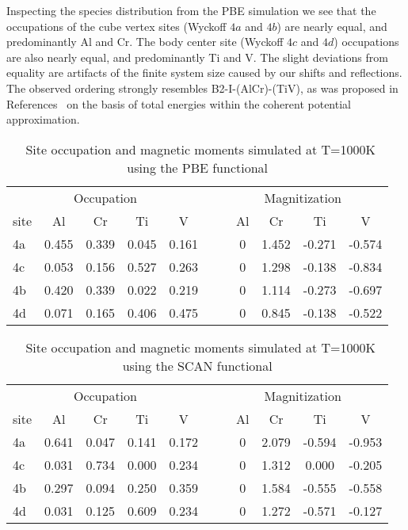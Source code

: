 \documentclass[twoside,12pt]{article}
\begin{document}
Inspecting the species distribution from the PBE simulation we see that the occupations of the cube vertex sites (Wyckoff $4a$ and $4b$) are nearly equal, and predominantly Al and Cr. The body center site (Wyckoff $4c$ and $4d$) occupations are also nearly equal, and predominantly Ti and V. The slight deviations from equality are artifacts of the finite system size caused by our shifts and reflections. The observed ordering strongly resembles B2-I-(AlCr)-(TiV), as was proposed in References~\cite{Tian,CA-CPA} on the basis of total energies within the coherent potential approximation.


\begin{table}[h]
\small
  \caption{\ Site occupation and magnetic moments simulated at T=1000K using the PBE functional}
  \label{tab:PBE}
  \begin{tabular*}{0.71\textwidth}{lcccccccccc}
    \hline
    \multicolumn{5}{c}{Occupation} & &\multicolumn{5}{c}{Magnitization} \\
    site&  Al &   Cr  &   Ti  &    V    & &   &    Al &   Cr  &   Ti  &    V \\
    \hline
    4a  & 0.455 & 0.339 & 0.045 & 0.161 & &   &     0 & 1.452 &-0.271 &-0.574 \\
    4c  & 0.053 & 0.156 & 0.527 & 0.263 & &   &     0 & 1.298 &-0.138 &-0.834 \\
    4b  & 0.420 & 0.339 & 0.022 & 0.219 & &   &     0 & 1.114 &-0.273 &-0.697 \\
    4d  & 0.071 & 0.165 & 0.406 & 0.475 & &   &     0 & 0.845 &-0.138 &-0.522 \\
    \hline
  \end{tabular*}
\end{table}

\begin{table}[h]
\small
  \caption{\ Site occupation and magnetic moments simulated at T=1000K using the SCAN functional}
  \label{tab:SCAN}
  \begin{tabular*}{0.71\textwidth}{lcccccccccc}
    \hline
    \multicolumn{5}{c}{Occupation} & &\multicolumn{5}{c}{Magnitization} \\
    site&  Al &   Cr  &   Ti  &    V    & &   &   Al &   Cr  &   Ti  &    V \\
    \hline
    4a  & 0.641 & 0.047 & 0.141 & 0.172 & &   &    0 & 2.079 &-0.594 &-0.953 \\
    4c  & 0.031 & 0.734 & 0.000 & 0.234 & &   &    0 & 1.312 & 0.000 &-0.205 \\
    4b  & 0.297 & 0.094 & 0.250 & 0.359 & &   &    0 & 1.584 &-0.555 &-0.558 \\
    4d  & 0.031 & 0.125 & 0.609 & 0.234 & &   &    0 & 1.272 &-0.571 &-0.127 \\
    \hline
  \end{tabular*}
\end{table}
\end{document}
